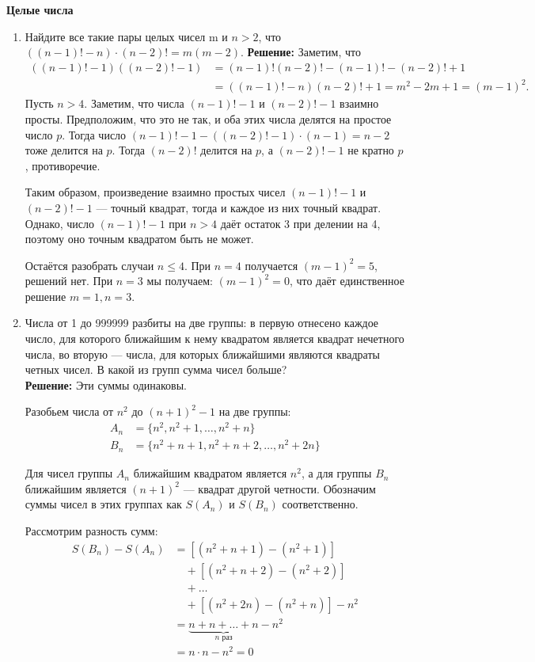 \documentclass[a4paper,12pt]{article}
\begin{document}
\begin{center}
    {\Large \textbf{Целые числа}}\\[0.5em]
\end{center}
    
\begin{enumerate}[label=\textbf{Задача \arabic*.}]
\item Найдите все такие пары целых чисел m и $n > 2$, что $((n-1)! - n) \cdot (n-2)! = m(m - 2)$.
\textbf{Решение:} Заметим, что
\begin{align*}
((n-1)!-1)((n-2)!-1) &= (n-1)!(n-2)!-(n-1)!-(n-2)!+1 \\
&= ((n-1)!-n)(n-2)!+1 = m^2-2m+1 = (m-1)^2.
\end{align*}
Пусть $n > 4$. Заметим, что числа $(n-1)!-1$ и $(n-2)!-1$ взаимно просты. Предположим, что это не так, и оба этих числа делятся на простое число $p$. Тогда число $(n-1)! - 1 - ((n-2)! - 1) \cdot (n-1) = n-2$ тоже делится на $p$. Тогда $(n-2)!$ делится на $p$, а $(n-2)!-1$ не кратно $p$, противоречие.

Таким образом, произведение взаимно простых чисел $(n-1)!-1$ и $(n-2)!-1$ --- точный квадрат, тогда и каждое из них точный квадрат. Однако, число $(n-1)!-1$ при $n > 4$ даёт остаток 3 при делении на 4, поэтому оно точным квадратом быть не может.

Остаётся разобрать случаи $n \le 4$. При $n=4$ получается $(m-1)^2=5$, решений нет. При $n=3$ мы получаем: $(m-1)^2 = 0$, что даёт единственное решение $m=1, n=3$.

\item Числа от 1 до 999999 разбиты на две группы: в первую отнесено каждое число, для которого ближайшим к нему квадратом является квадрат нечетного числа, во вторую — числа, для которых ближайшими являются квадраты четных чисел. В какой из групп сумма чисел
больше? \\
\textbf{Решение:} Эти суммы одинаковы.

Разобьем числа от $n^2$ до $(n+1)^2 - 1$ на две группы:
\begin{align*}
A_n &= \{n^2, n^2+1, \dots, n^2+n\} \\
B_n &= \{n^2+n+1, n^2+n+2, \dots, n^2+2n\}
\end{align*}

Для чисел группы $A_n$ ближайшим квадратом является $n^2$, а для группы $B_n$ ближайшим является $(n+1)^2$ --- квадрат другой четности. Обозначим суммы чисел в этих группах как $S(A_n)$ и $S(B_n)$ соответственно.

Рассмотрим разность сумм:
\begin{align*}
S(B_n) - S(A_n) &= [(n^2+n+1) - (n^2+1)] \\
&\quad + [(n^2+n+2) - (n^2+2)] \\
&\quad + \dots \\
&\quad + [(n^2+2n) - (n^2+n)] - n^2 \\
&= \underbrace{n+n+\dots+n}_{n \text{ раз}} - n^2 \\
&= n \cdot n - n^2 = 0
\end{align*}


\end{enumerate}
\end{document}
